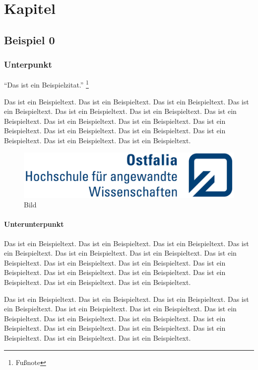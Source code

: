 \chapter{Kapitel}

\section{Beispiel 0}

\subsection{Unterpunkt}
\enquote{Das ist ein Beispielzitat.} \footnote{Fußnote}

Das ist ein Beispieltext. Das ist ein Beispieltext. Das ist ein Beispieltext. Das ist ein Beispieltext. Das ist ein Beispieltext. Das ist ein Beispieltext. Das ist ein Beispieltext. Das ist ein Beispieltext. Das ist ein Beispieltext. Das ist ein Beispieltext. Das ist ein Beispieltext. Das ist ein Beispieltext. Das ist ein Beispieltext. Das ist ein Beispieltext. Das ist ein Beispieltext.

\begin{figure}
	\centering
	\includegraphics{./images/logos/logo_ostfalia.jpg}
	\caption{Bild}
\end{figure}

\subsubsection{Unterunterpunkt}
Das ist ein Beispieltext. Das ist ein Beispieltext. Das ist ein Beispieltext. Das ist ein Beispieltext. Das ist ein Beispieltext. Das ist ein Beispieltext. Das ist ein Beispieltext. Das ist ein Beispieltext. Das ist ein Beispieltext. Das ist ein Beispieltext. Das ist ein Beispieltext. Das ist ein Beispieltext. Das ist ein Beispieltext. Das ist ein Beispieltext. Das ist ein Beispieltext.

Das ist ein Beispieltext. Das ist ein Beispieltext. Das ist ein Beispieltext. Das ist ein Beispieltext. Das ist ein Beispieltext. Das ist ein Beispieltext. Das ist ein Beispieltext. Das ist ein Beispieltext. Das ist ein Beispieltext. Das ist ein Beispieltext. Das ist ein Beispieltext. Das ist ein Beispieltext. Das ist ein Beispieltext. Das ist ein Beispieltext. Das ist ein Beispieltext.

